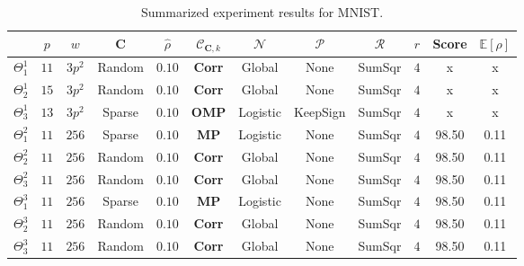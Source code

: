 \documentclass[12pt,a4paper,oneside,english]{UPBThesis}
\begin{document}
\renewcommand{\arraystretch}{1.2}
\begin{table}
  \caption{Summarized experiment results for MNIST.}
  \label{table:RecoderEvMNISTResultsSummarized}
  \begin{tabularx}{\textwidth}{|R|ccccccccccc|}
    \hline
    & $p$ & $w$ & $\textbf{C}$ & $\hat{\rho}$ & $\mathcal{C}_{\textbf{C},k}$ & $\mathcal{N}$ & $\mathcal{P}$ & $\mathcal{R}$ & $r$ & Score & $\mathbb{E}[\rho]$ \tabularnewline\hline\hline
    $\Theta_1^1$ & $11$ & $3p^2$ & Random & $0.10$ & \textbf{Corr} & Global & None & SumSqr & $4$ & x & x \tabularnewline
    $\Theta_2^1$ & $15$ & $3p^2$ & Random & $0.10$ & \textbf{Corr} & Global & None & SumSqr & $4$ & x & x \tabularnewline
    $\Theta_3^1$ & $13$ & $3p^2$ & Sparse & $0.10$ & \textbf{OMP} & Logistic & KeepSign & SumSqr & $4$ & x & x \tabularnewline\hline\hline
    $\Theta_1^2$ & $11$ & $256$ & Sparse & $0.10$ & \textbf{MP} & Logistic & None & SumSqr & $4$ & 98.50 & 0.11 \tabularnewline
    $\Theta_2^2$ & $11$ & $256$ & Random & $0.10$ & \textbf{Corr} & Global & None & SumSqr & $4$ & 98.50 & 0.11 \tabularnewline
    $\Theta_3^2$ & $11$ & $256$ & Random & $0.10$ & \textbf{Corr} & Global & None & SumSqr & $4$ & 98.50 & 0.11 \tabularnewline\hline\hline
    $\Theta_1^3$ & $11$ & $256$ & Sparse & $0.10$ & \textbf{MP} & Logistic & None & SumSqr & $4$ & 98.50 & 0.11 \tabularnewline
    $\Theta_2^3$ & $11$ & $256$ & Random & $0.10$ & \textbf{Corr} & Global & None & SumSqr & $4$ & 98.50 & 0.11 \tabularnewline
    $\Theta_3^3$ & $11$ & $256$ & Random & $0.10$ & \textbf{Corr} & Global & None & SumSqr & $4$ & 98.50 & 0.11 \tabularnewline
    \hline
  \end{tabularx}
\end{table}
\renewcommand{\arraystretch}{1.0}
\end{document}
